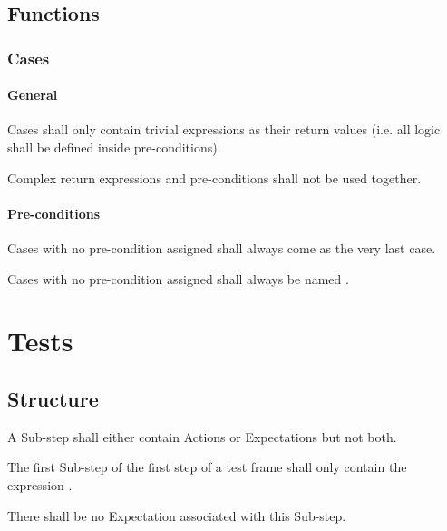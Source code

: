 \documentclass[draft]{efsguide}
\begin{document}
\section{Functions}
\subsection{Cases}

\subsubsection{General}
\begin{rules}
\item \label{rule:functions_cases_general_trivialexpressions} Cases shall only contain trivial expressions as their return values (i.e. all logic shall be defined inside pre-conditions). 
\item {} Complex return expressions and pre-conditions shall not be used together.  
\end{rules}

\subsubsection{Pre-conditions}
\begin{rules}
\item Cases with no pre-condition assigned shall always come as the very last case. 
\item Cases with no pre-condition assigned shall always be named . 
\end{rules}

\chapter{Tests}

\section{Structure}
\begin{rules}
\item {} A Sub-step shall either contain Actions or Expectations but not both. 
\item The first Sub-step of the first step of a test frame shall only contain the expression . 
\begin{rules}
\item There shall be no Expectation associated with this Sub-step. 
\end{rules}
\end{rules}
\end{document}
